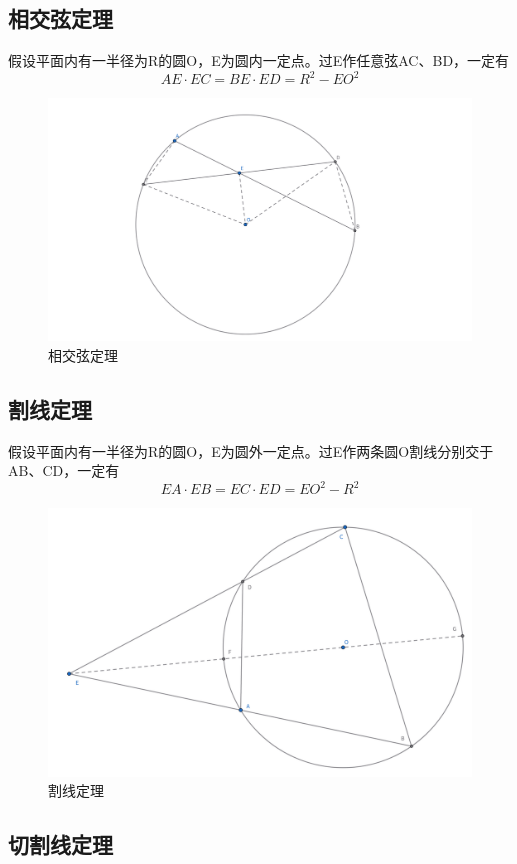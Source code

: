 \subsection{相交弦定理}
\begin{theorem}[相交弦定理]
    假设平面内有一半径为R的圆O，E为圆内一定点。过E作任意弦AC、BD，一定有
    $$
    AE \cdot EC =BE \cdot ED = R^2 - EO^2
    $$
\end{theorem}
\begin{figure}[H]
    \centering
    \includegraphics[width=0.7\linewidth]{figures/相交弦定理.png}
    \caption{相交弦定理}
\end{figure}


\subsection{割线定理}
\begin{theorem}[割线定理]
   假设平面内有一半径为R的圆O，E为圆外一定点。过E作两条圆O割线分别交于AB、CD，一定有
$$
EA \cdot EB =EC \cdot ED = EO^2 -R^2
$$
\end{theorem}
\begin{figure}[H]
    \centering
    \includegraphics[width=0.7\linewidth]{figures/割线定理.png}
    \caption{割线定理}
\end{figure}


\subsection{切割线定理}

